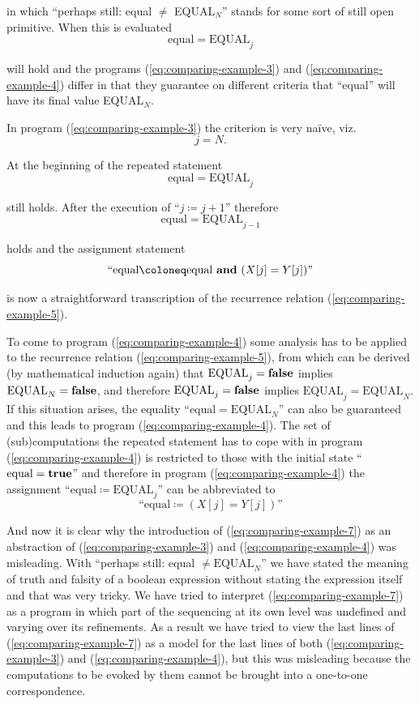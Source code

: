 \documentclass[twoside,11pt]{book}
\begin{document}
\noindent
in which ``perhaps still: equal $\neq$ EQUAL$_N$'' stands for some sort of still open primitive. When this is evaluated
$$
\text{equal} = \text{EQUAL}_j
$$

\noindent
will hold and the programs (\ref{eq:comparing-example-3}) and (\ref{eq:comparing-example-4}) differ in that they guarantee on different criteria that ``equal'' will have its final value EQUAL$_N$.

In program (\ref{eq:comparing-example-3}) the criterion is very naïve, viz.
$$
j = N.
$$

\noindent
At the beginning of the repeated statement
$$
\text{equal} = \text{EQUAL}_j
$$

\noindent
still holds. After the execution of ``$j \coloneq j + 1$'' therefore
$$
\text{equal} = \text{EQUAL}_{j-1}
$$

\noindent
holds and the assignment statement
$$
\text{``equal} \coloneq \text{equal \textbf{and} } (X[j] = Y[j])\text{''}
$$

\noindent
is now a straightforward transcription of the recurrence relation (\ref{eq:comparing-example-5}).

To come to program (\ref{eq:comparing-example-4}) some analysis has to be applied to the recurrence relation (\ref{eq:comparing-example-5}), from which can be derived (by mathematical induction again) that $\text{EQUAL}_j = \text{\textbf{false}}$ implies $\text{EQUAL}_N = \text{\textbf{false}}$, and therefore $\text{EQUAL}_j = \text{\textbf{false}}$ implies $\text{EQUAL}_j = \text{EQUAL}_N$. If this situation arises, the equality ``$\text{equal} = \text{EQUAL}_N$'' can also be guaranteed and this leads to program (\ref{eq:comparing-example-4}). The set of (sub)computations the repeated statement has to cope with in program (\ref{eq:comparing-example-4}) is restricted to those with the initial state ``$\text{equal} = \text{\textbf{true}}$'' and therefore in program (\ref{eq:comparing-example-4}) the assignment ``$\text{equal} \coloneq \text{EQUAL}_j$'' can be abbreviated to
$$
\text{``equal} \coloneq (X[j] = Y[j])\text{''}
$$

And now it is clear why the introduction of (\ref{eq:comparing-example-7}) as an abstraction of (\ref{eq:comparing-example-3}) and (\ref{eq:comparing-example-4}) was misleading. With ``perhaps still: equal $\neq \text{EQUAL}_N$'' we have stated the meaning of truth and falsity of a boolean expression without stating the expression itself and that was very tricky. We have tried to interpret (\ref{eq:comparing-example-7}) as a program in which part of the sequencing at its own level was undefined and varying over its refinements. As a result we have tried to view the last lines of (\ref{eq:comparing-example-7}) as a model for the last lines of both (\ref{eq:comparing-example-3}) and (\ref{eq:comparing-example-4}), but this was misleading because the computations to be evoked by them cannot be brought into a one-to-one correspondence.
\end{document}
